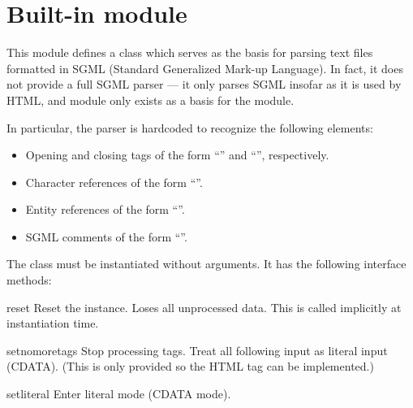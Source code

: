 \section{Built-in module }

\renewcommand{\indexsubitem}{(in module sgmllib)}

This module defines a class  which serves as the
basis for parsing text files formatted in SGML (Standard Generalized
Mark-up Language).  In fact, it does not provide a full SGML parser
--- it only parses SGML insofar as it is used by HTML, and module only
exists as a basis for the  module.

In particular, the parser is hardcoded to recognize the following
elements:

\begin{itemize}

\item
Opening and closing tags of the form
``'' and
``'', respectively.

\item
Character references of the form ``''.

\item
Entity references of the form ``''.

\item
SGML comments of the form ``''.

\end{itemize}

The  class must be instantiated without arguments.
It has the following interface methods:

\begin{funcdesc}{reset}{}
Reset the instance.  Loses all unprocessed data.  This is called
implicitly at instantiation time.
\end{funcdesc}

\begin{funcdesc}{setnomoretags}{}
Stop processing tags.  Treat all following input as literal input
(CDATA).  (This is only provided so the HTML tag 
can be implemented.)
\end{funcdesc}

\begin{funcdesc}{setliteral}{}
Enter literal mode (CDATA mode).
\end{funcdesc}

